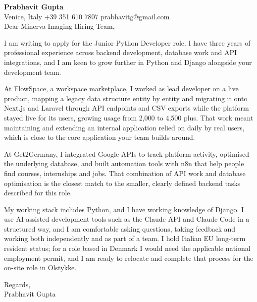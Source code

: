\documentclass[a4paper,10.5pt]{article}
\begin{document}
\textbf{Prabhavit Gupta}\\
Venice, Italy \textbar{} +39 351 610 7807 \textbar{} prabhavitg@gmail.com\\[10pt]
Dear Minerva Imaging Hiring Team,

I am writing to apply for the Junior Python Developer role. I have three years of professional experience across backend development, database work and API integrations, and I am keen to grow further in Python and Django alongside your development team.

At FlowSpace, a workspace marketplace, I worked as lead developer on a live product, mapping a legacy data structure entity by entity and migrating it onto Next.js and Laravel through API endpoints and CSV exports while the platform stayed live for its users, growing usage from 2,000 to 4,500 plus. That work meant maintaining and extending an internal application relied on daily by real users, which is close to the core application your team builds around.

At Get2Germany, I integrated Google APIs to track platform activity, optimised the underlying database, and built automation tools with n8n that help people find courses, internships and jobs. That combination of API work and database optimisation is the closest match to the smaller, clearly defined backend tasks described for this role.

My working stack includes Python, and I have working knowledge of Django. I use AI-assisted development tools such as the Claude API and Claude Code in a structured way, and I am comfortable asking questions, taking feedback and working both independently and as part of a team. I hold Italian EU long-term resident status; for a role based in Denmark I would need the applicable national employment permit, and I am ready to relocate and complete that process for the on-site role in Olstykke.

Regards,\\
Prabhavit Gupta
\end{document}
